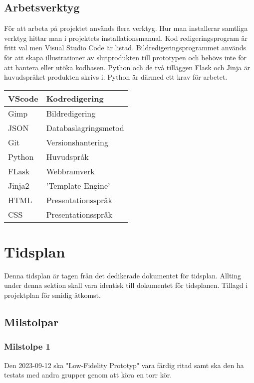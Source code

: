 \documentclass{liu_mall}
\begin{document}
    \subsection{Arbetsverktyg}
        För att arbeta på projektet används flera verktyg. Hur man installerar samtliga verktyg hittar man i projektets installationsmanual. Kod redigeringsprogram är fritt val men Visual Studio Code är listad. Bildredigeringsprogrammet används för att skapa illustrationer av slutprodukten till prototypen och behövs inte för att hantera eller utöka kodbasen. Python och de två tilläggen Flask och Jinja är huvudspråket produkten skrivs i. Python är därmed ett krav för arbetet. 
        \begin{table}[!h]
            \begin{tabular}{l l}
                VScode & Kodredigering\\\hline
                Gimp & Bildredigering\\\hline
                JSON & Databaslagringsmetod\\\hline
                Git & Versionshantering\\\hline
                Python & Huvudspråk\\\hline
                FLask & Webbramverk\\\hline
                Jinja2 & 'Template Engine'\\\hline
                HTML & Presentationsspråk\\\hline
                CSS & Presentationsspråk\\\hline
            \end{tabular}
            \label{tab:my_label}
        \end{table}

\newpage
\section{Tidsplan}
    Denna tidsplan är tagen från det dedikerade dokumentet för tidsplan. Allting under denna sektion skall vara identisk till dokumentet för tidsplanen. Tillagd i projektplan för smidig åtkomst.
    
    \subsection{Milstolpar}
    \subsubsection{Milstolpe 1}
    Den 2023-09-12 ska "Low-Fidelity Prototyp" vara färdig ritad samt ska den ha testats med andra grupper genom att köra en torr kör.
\end{document}
